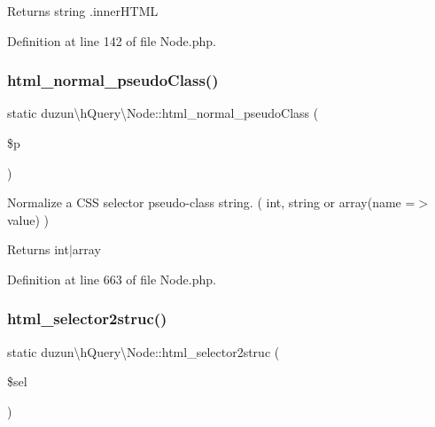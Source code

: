\begin{DoxyReturn}{Returns}
string .inner\+H\+T\+ML 
\end{DoxyReturn}


Definition at line 142 of file Node.\+php.

\mbox{\label{classduzun_1_1hQuery_1_1Node_a82f0739b0292cfb11570eeca08ac98c4}} 
\subsubsection{\texorpdfstring{html\+\_\+normal\+\_\+pseudo\+Class()}{html\_normal\_pseudoClass()}}
{\footnotesize\ttfamily static duzun\textbackslash{}h\+Query\textbackslash{}\+Node\+::html\+\_\+normal\+\_\+pseudo\+Class (\begin{DoxyParamCaption}\item[{}]{\$p }\end{DoxyParamCaption})\hspace{0.3cm}{\ttfamily [static]}}

Normalize a C\+SS selector pseudo-\/class string. ( int, string or array(name =$>$ value) )

\begin{DoxyReturn}{Returns}
int$\vert$array 
\end{DoxyReturn}


Definition at line 663 of file Node.\+php.

\mbox{\label{classduzun_1_1hQuery_1_1Node_ac54f15080a896a8bad6bb21bddf56bac}} 
\subsubsection{\texorpdfstring{html\+\_\+selector2struc()}{html\_selector2struc()}}
{\footnotesize\ttfamily static duzun\textbackslash{}h\+Query\textbackslash{}\+Node\+::html\+\_\+selector2struc (\begin{DoxyParamCaption}\item[{}]{\$sel }\end{DoxyParamCaption})\hspace{0.3cm}{\ttfamily [static]}}

